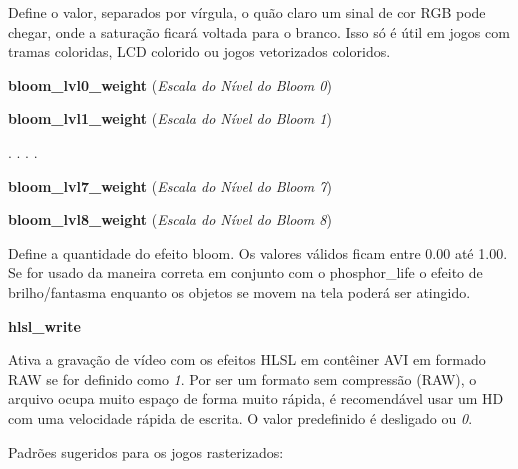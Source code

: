 \documentclass[letterpaper,10pt,brazil]{sphinxmanual}
\begin{document}
\begin{DUlineblock}{0em}
\item[]
\begin{DUlineblock}{\DUlineblockindent}
\item[] Define o valor, separados por vírgula, o quão claro um sinal de cor RGB pode chegar, onde a saturação ficará voltada para o branco. Isso só é útil em jogos com tramas coloridas, LCD colorido ou jogos vetorizados coloridos.
\item[] 
\end{DUlineblock}
\item[] \textbf{bloom\_lvl0\_weight} (\emph{Escala do Nível do Bloom 0})
\item[] \textbf{bloom\_lvl1\_weight} (\emph{Escala do Nível do Bloom 1})
\item[]
\begin{DUlineblock}{\DUlineblockindent}
\item[] .  .  .  .
\end{DUlineblock}
\item[] \textbf{bloom\_lvl7\_weight} (\emph{Escala do Nível do Bloom 7})
\item[] \textbf{bloom\_lvl8\_weight} (\emph{Escala do Nível do Bloom 8})
\item[] 
\item[]
\begin{DUlineblock}{\DUlineblockindent}
\item[] Define a quantidade do efeito bloom. Os valores válidos ficam entre 0.00 até 1.00. Se for usado da maneira correta em conjunto com o phosphor\_life o efeito de brilho/fantasma enquanto os objetos se movem na tela poderá ser atingido.
\item[] 
\end{DUlineblock}
\item[] \textbf{hlsl\_write}
\item[] 
\item[]
\begin{DUlineblock}{\DUlineblockindent}
\item[] Ativa a gravação de vídeo com os efeitos HLSL em contêiner AVI em formado RAW se for definido como \emph{1}. Por ser um formato sem compressão (RAW), o arquivo ocupa muito espaço de forma muito rápida, é recomendável usar um HD com uma velocidade rápida de escrita. O valor predefinido é desligado ou \emph{0}.
\item[] 
\end{DUlineblock}
\end{DUlineblock}

\begin{DUlineblock}{0em}
\item[] Padrões sugeridos para os jogos rasterizados:
\item[] 
\end{DUlineblock}
\end{document}
